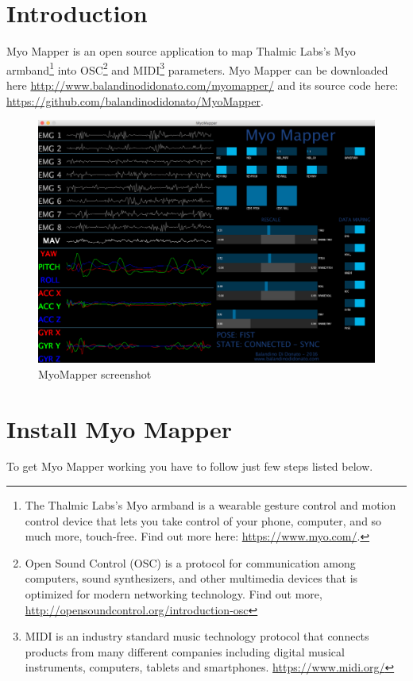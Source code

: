 \documentclass[12pt,a4paper]{article}
\begin{document}
\newpage
\section{Introduction}
Myo Mapper is an open source application to map Thalmic Labs's Myo armband\footnote{The Thalmic Labs's Myo armband is a wearable gesture control and motion control device that lets you take control of your phone, computer, and so much more, touch-free. Find out more here: \url{https://www.myo.com/}.} into OSC\footnote{Open Sound Control (OSC) is a protocol for communication among computers, sound synthesizers, and other multimedia devices that is optimized for modern networking technology. Find out more, \url{http://opensoundcontrol.org/introduction-osc}} and MIDI\footnote{MIDI is an industry standard music technology protocol that connects products from many different companies including digital musical instruments, computers, tablets and smartphones. \url{https://www.midi.org/}} parameters. Myo Mapper can be downloaded here \url{http://www.balandinodidonato.com/myomapper/} and its source code here: \url{https://github.com/balandinodidonato/MyoMapper}.

	\begin{figure}[h]
		\centering
		\includegraphics[width=1\linewidth]{../images/MyoMapper}
		\caption{MyoMapper screenshot}
		\label{fig:MyoMapperIntro}
	\end{figure}

\newpage

\section{Install Myo Mapper}
To get Myo Mapper working you have to follow just few steps listed below.
\end{document}
